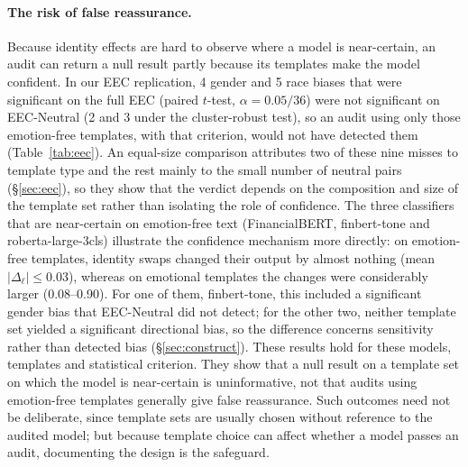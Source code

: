 \documentclass[runningheads]{llncs}
\begin{document}
\paragraph{The risk of false reassurance.} Because identity effects are hard to
observe where a model is near-certain, an audit can return a null result partly
because its templates make the model confident. In our EEC replication, 4
gender and 5 race biases that were significant on the full EEC (paired $t$-test,
$\alpha=0.05/36$) were not significant on EEC-Neutral (2 and 3 under the
cluster-robust test), so an audit using only
those emotion-free templates, with that criterion, would not have detected them
(Table~\ref{tab:eec}). An equal-size comparison attributes two of these nine
misses to template type and the rest mainly to the small number of neutral
pairs (\S\ref{sec:eec}), so they show that the verdict depends on the
composition and size of the template set rather than isolating the role of
confidence. The three classifiers that are near-certain on
emotion-free text (FinancialBERT, finbert-tone and roberta-large-3cls)
illustrate the confidence mechanism more directly: on emotion-free templates, identity swaps changed
their output by almost nothing (mean $|\Delta_\ell|\leq 0.03$), whereas on
emotional templates the changes were considerably larger (0.08--0.90). For one
of them, finbert-tone, this included a significant gender bias that EEC-Neutral
did not detect; for the other two, neither template set yielded a significant
directional bias, so the difference concerns sensitivity rather than detected
bias (\S\ref{sec:construct}). These results hold for these models, templates and
statistical criterion. They show that a null result on a template set on which
the model is near-certain is uninformative, not that audits using emotion-free
templates generally give false reassurance. Such outcomes need not be
deliberate, since template sets are usually chosen without reference to the
audited model; but because template choice can affect whether a model passes an
audit, documenting the design is the safeguard.
\end{document}
